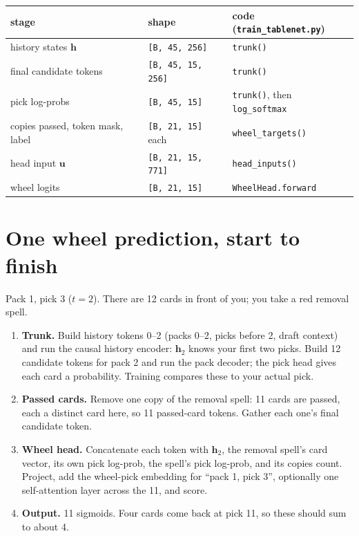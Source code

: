 \documentclass[11pt,letterpaper]{article}
\newcommand{\code}[1]{\texttt{\small #1}}
\newcommand{\shape}[1]{\texttt{\footnotesize[#1]}}
\begin{document}
\begin{center}\small
\begin{tabular}{lll}
\toprule
stage & shape & code (\code{train\_tablenet.py}) \\
\midrule
history states $\mathbf h$ & \shape{B, 45, 256} & \code{trunk()} \\
final candidate tokens & \shape{B, 45, 15, 256} & \code{trunk()} \\
pick log-probs & \shape{B, 45, 15} & \code{trunk()}, then \code{log\_softmax} \\
copies passed, token mask, label & \shape{B, 21, 15} each & \code{wheel\_targets()} \\
head input $\mathbf u$ & \shape{B, 21, 15, 771} & \code{head\_inputs()} \\
wheel logits & \shape{B, 21, 15} & \code{WheelHead.forward} \\
\bottomrule
\end{tabular}
\end{center}

\section{One wheel prediction, start to finish}

Pack 1, pick 3 ($t=2$). There are 12 cards in front of you; you take a red removal spell.

\begin{enumerate}
\item \textbf{Trunk.} Build history tokens 0--2 (packs 0--2, picks before 2, draft context) and run the
causal history encoder: $\mathbf h_2$ knows your first two picks. Build 12 candidate tokens for pack 2 and
run the pack decoder; the pick head gives each card a probability. Training compares these to your actual
pick.
\item \textbf{Passed cards.} Remove one copy of the removal spell: 11 cards are passed, each a distinct
card here, so 11 passed-card tokens. Gather each one's final candidate token.
\item \textbf{Wheel head.} Concatenate each token with $\mathbf h_2$, the removal spell's card vector, its own
pick log-prob, the spell's pick log-prob, and its copies count. Project, add the wheel-pick embedding for
``pack 1, pick 3'', optionally one self-attention layer across the 11, and score.
\item \textbf{Output.} 11 sigmoids. Four cards come back at pick 11, so these should sum to about 4.
\end{enumerate}
\end{document}
